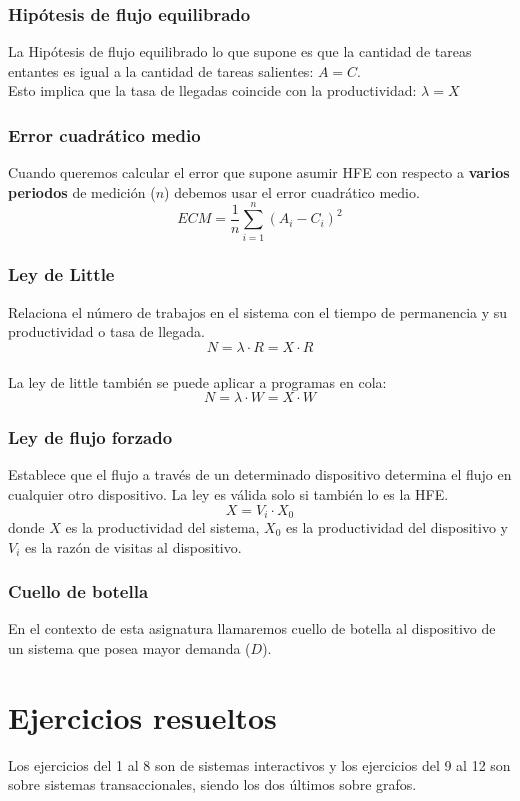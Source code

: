 \subsubsection{Hipótesis de flujo equilibrado}
    La Hipótesis de flujo equilibrado lo que supone es que la cantidad de tareas entantes es igual a la cantidad de tareas salientes: $A = C$.\\
    Esto implica que la tasa de llegadas coincide con la productividad: $\lambda = X$
\subsubsection{Error cuadrático medio}
    Cuando queremos calcular el error que supone asumir HFE con respecto a \textbf{varios periodos} de medición ($n$) debemos usar el error cuadrático medio. \[ECM = \dfrac{1}{n}\sum_{i=1}^{n}(A_i - C_i)^2 \]
\subsubsection{Ley de Little}
    Relaciona el número de trabajos en el sistema con el tiempo de permanencia y su productividad o tasa de llegada.\\
    \[N = \lambda \cdot R = X\cdot R\]\\
    La ley de little también se puede aplicar a programas en cola:\\
    \[N = \lambda \cdot W = X\cdot W\]
\subsubsection{Ley de flujo forzado}
   Establece que el flujo a través de un determinado dispositivo determina el flujo en cualquier otro dispositivo. La ley es válida solo si también lo es la HFE.
   \[X = V_i \cdot X_0\]
   donde $X$ es la productividad del sistema, $X_0$ es la productividad del dispositivo y $V_i$ es la razón de visitas al dispositivo.
   
\subsubsection{Cuello de botella}
    En el contexto de esta asignatura llamaremos cuello de botella al dispositivo de un sistema que posea mayor demanda ($D$).
\newpage
\section{Ejercicios resueltos}
Los ejercicios del 1 al 8 son de sistemas interactivos y los ejercicios del 9 al 12 son sobre sistemas transaccionales, siendo los dos últimos sobre grafos.

